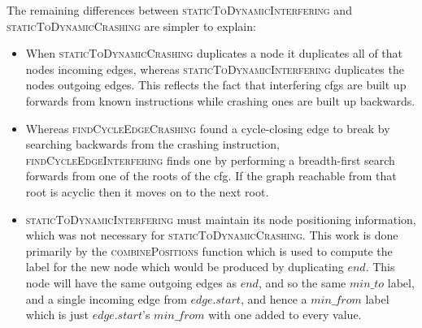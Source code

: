 The remaining differences between \textsc{staticToDynamicInterfering}
and \textsc{staticToDynamicCrashing} are simpler to explain:
\begin{itemize}
\item When \textsc{staticToDynamicCrashing} duplicates a node it
  duplicates all of that nodes incoming edges, whereas
  \textsc{staticToDynamicInterfering} duplicates the nodes outgoing
  edges.  This reflects the fact that interfering \glspl{cfg} are
  built up forwards from known instructions while crashing ones are
  built up backwards.
\item Whereas \textsc{findCycleEdgeCrashing} found a cycle-closing
  edge to break by searching backwards from the crashing instruction,
  \textsc{findCycleEdgeInterfering} finds one by performing a
  breadth-first search forwards from one of the roots of the
  \gls{cfg}.  If the graph reachable from that root is acyclic then it
  moves on to the next root.
\item \textsc{staticToDynamicInterfering} must maintain its node
  positioning information, which was not necessary for
  \textsc{staticToDynamicCrashing}.  This work is done primarily by
  the \textsc{combinePositions} function which is used to compute the
  label for the new node which would be produced by duplicating
  $\mathit{end}$.  This node will have the same outgoing edges as
  $\mathit{end}$, and so the same $min\_to$ label, and a single
  incoming edge from $\mathit{edge}.\mathit{start}$, and hence a
  $\mathit{min\_from}$ label which is just
  $\mathit{edge}.\mathit{start}$'s $\mathit{min\_from}$ with one added
  to every value.
\end{itemize}

\newcommand{\shortrightarrow}{\begin{tikzpicture}[baseline= -1ex*.75]
    \draw[->] (0,0) -- ++(.25,0);
  \end{tikzpicture}
  \hspace{-1pt}
}

